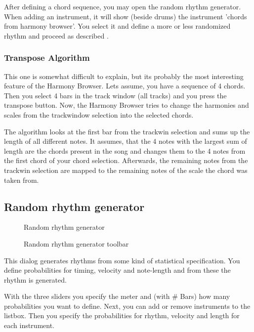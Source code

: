 \documentclass[letterpaper]{report}
\begin{document}
After defining a chord sequence, you may open the random rhythm
generator. When adding an instrument, it will show (beside drums) the
instrument 'chords from harmony browser'. You select it and define a more or
less randomized rhythm and proceed as described .

\subsubsection{Transpose Algorithm}

This one is somewhat difficult to explain, but its probably the most
interesting feature of the Harmony Browser.  Lets assume, you have a
sequence of 4 chords. Then you select 4 bars in the track window (all
tracks) and you press the transpose button.  Now, the Harmony Browser
tries to change the harmonies and scales from the trackwindow selection
into the selected chords.

The algorithm looks at the first bar from the trackwin selection and
sums up the length of all different notes. It assumes, that the 4 notes with the
largest sum of length are the chords present in the song and changes them
to the 4 notes from the first chord of your chord selection. Afterwards,
the remaining notes from the trackwin selection are mapped to the remaining
notes of the scale the chord was taken from.



\subsection{Random rhythm generator}\label{randrhy}

\begin{figure}%
%
%
\caption{Random rhythm generator}%
\end{figure}

\begin{figure}%
%
%
\caption{Random rhythm generator toolbar}%
\end{figure}

This dialog generates rhythms from some kind of statistical specification.
You define probabilities for timing, velocity and note-length and from these
the rhythm is generated.

With the three sliders you specify the meter and (with \# Bars) how many
probabilities you want to define. Next, you can add or remove instruments
to the listbox. Then you specify the probabilities for rhythm, velocity
and length for each instrument.
\end{document}
